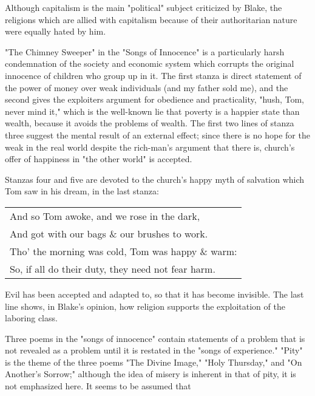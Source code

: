 \noindent  Although capitalism is the main "political" subject criticized by Blake,
the religions which are allied with capitalism because of their authoritarian nature were equally hated by him.\par
\vspace*{0.5\baselineskip}
"The Chimney Sweeper" in the "Songs of Innocence" is a particularly harsh condemnation of the society and economic system
which corrupts the original innocence of children who group up in it. The first stanza is direct statement of the power of money
over weak individuals (and my father sold me), and the second gives the exploiters argument for obedience and practicality, "hush, Tom, never mind it," which
is the well-known lie that poverty is a happier state than wealth, because it avoids the problems of wealth. The first two lines
of stanza three suggest the mental result of an external effect; since there is no hope for the weak in the real world despite the rich-man's argument
that there is, church's offer of happiness in "the other world" is accepted.\par
\vspace*{0.5\baselineskip}
Stanzas four and five are devoted to the church's happy myth of salvation which Tom saw in his dream, in the last stanza:\par
\begin{center}
	\parbox{0.8\textwidth}{
		\centering
		\begin{tabular}{l}
			And so Tom awoke, and we rose in the dark,        \\
			And got with our bags \& our brushes to work.     \\
			Tho' the morning was cold, Tom was happy \& warm: \\
			So, if all do their duty, they need not fear harm.
		\end{tabular}
	}%
\end{center}
Evil has been accepted and adapted to, so that it has become invisible. The last line shows, in Blake's opinion, how
religion supports the exploitation of the laboring class.\par
\vspace*{0.5\baselineskip}
Three poems in the "songs of innocence" contain statements of a problem that is not revealed as a problem until
it is restated in the "songs of experience." "Pity" is the theme of the three poems "The Divine Image," "Holy Thursday," and
"On Another's Sorrow;" although the idea of misery is inherent in that of pity, it is not emphasized here. It seems to be assumed that
